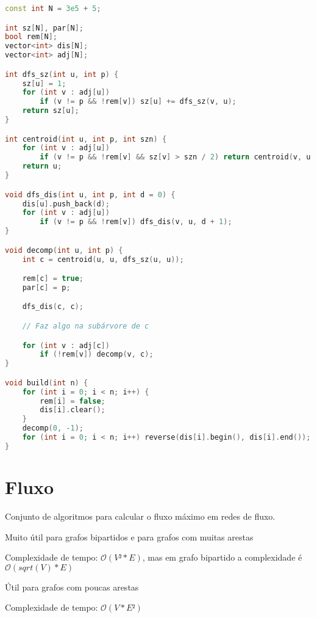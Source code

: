 \documentclass[10pt, a4paper, oneside]{book}
\begin{document}
\begin{lstlisting}[language=C++]
const int N = 3e5 + 5;

int sz[N], par[N];
bool rem[N];
vector<int> dis[N];
vector<int> adj[N];

int dfs_sz(int u, int p) {
    sz[u] = 1;
    for (int v : adj[u])
        if (v != p && !rem[v]) sz[u] += dfs_sz(v, u);
    return sz[u];
}

int centroid(int u, int p, int szn) {
    for (int v : adj[u])
        if (v != p && !rem[v] && sz[v] > szn / 2) return centroid(v, u, szn);
    return u;
}

void dfs_dis(int u, int p, int d = 0) {
    dis[u].push_back(d);
    for (int v : adj[u])
        if (v != p && !rem[v]) dfs_dis(v, u, d + 1);
}

void decomp(int u, int p) {
    int c = centroid(u, u, dfs_sz(u, u));

    rem[c] = true;
    par[c] = p;

    dfs_dis(c, c);

    // Faz algo na subárvore de c

    for (int v : adj[c])
        if (!rem[v]) decomp(v, c);
}

void build(int n) {
    for (int i = 0; i < n; i++) {
        rem[i] = false;
        dis[i].clear();
    }
    decomp(0, -1);
    for (int i = 0; i < n; i++) reverse(dis[i].begin(), dis[i].end());
}\end{lstlisting}
\hfill

\section{Fluxo}


Conjunto de algoritmos para calcular o fluxo máximo em redes de fluxo.



\textbf{} 


Muito útil para grafos bipartidos e para grafos com muitas arestas



Complexidade de tempo: $\mathcal{O}(V² * E)$, mas em grafo bipartido a complexidade é $\mathcal{O}(sqrt(V) * E)$



\textbf{} 


Útil para grafos com poucas arestas



Complexidade de tempo: $\mathcal{O}(V * E²)$
\end{document}
